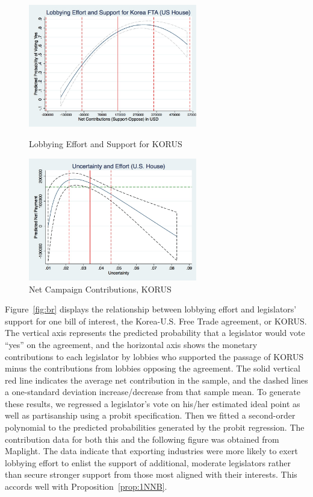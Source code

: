 \documentclass[12pt]{article}
\begin{document}
\begin{figure}
\centering
\begin{minipage}{.5\textwidth}
  \centering
  \includegraphics[width=2.9in]{graph2.jpg}
  \caption{\small Lobbying Effort and Support for KORUS
	\label{fig:br}}
\end{minipage}%
\begin{minipage}{.5\textwidth}
  \centering
  \includegraphics[width=2.9in]{graph1.jpg}
  \caption{\small Net Campaign Contributions, KORUS
	\label{fig:g1}}
\end{minipage}
\end{figure}

Figure~\ref{fig:br} displays the relationship between lobbying effort and legislators' support for one bill of interest, the Korea-U.S. Free Trade agreement, or KORUS. The vertical axis represents the predicted probability that a legislator would vote ``yes'' on the agreement, and the horizontal axis shows the monetary contributions to each legislator by lobbies who supported the passage of KORUS minus the contributions from lobbies opposing the agreement. The solid vertical red line indicates the average net contribution in the sample, and the dashed lines a one-standard deviation increase/decrease from that sample mean. To generate these results,  we regressed a legislator's vote on his/her estimated ideal point as well as partisanship using a probit specification. Then we fitted a second-order polynomial to the predicted probabilities generated by the probit regression. The contribution data for both this and the following figure was obtained from Maplight. The data indicate that exporting industries were more likely to exert lobbying effort to enlist the support of additional, moderate legislators rather than secure stronger support from those most aligned with their interests. This accords well with Proposition~\ref{prop:1NNB}.
\end{document}
